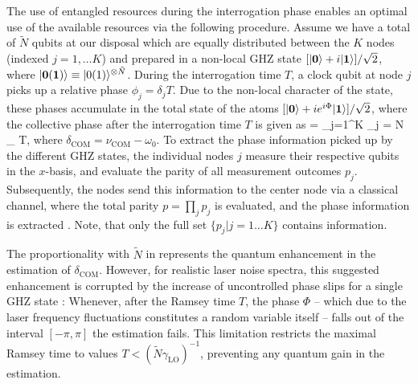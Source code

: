 The use of entangled resources 
during
the interrogation phase enables an optimal use of the available resources via
the following procedure.  Assume we have a total of $\tilde N$ 
qubits at
our disposal which are equally distributed between the $K$ nodes (indexed
$j=1,\hdots K$) and prepared in a non-local GHZ state $[| \mathbf{0} \rangle +
i| \mathbf{1} \rangle]/\sqrt{2}$, where $| \mathbf{0 (1)} \rangle\equiv| 0(1) \rangle^{\otimes
\tilde N}$. During the
interrogation time $T$, a clock qubit at node $j$ picks up a relative phase $\phi_j = \delta_j
T$.
Due to the non-local character of the state, these phases accumulate in the total
state of the atoms  $[| \mathbf{0} \rangle + i e^{i\Phi}| \mathbf{1} \rangle]/\sqrt{2}$,
where the collective phase after the interrogation time $T$ is given as
\bel
\label{eq:1}
\Phi = \sum_{j=1}^K  \phi_j =
\tilde N \delta_ T,
\eel
where $\delta_\mathrm{COM} = \nu_\mathrm{COM} - \omega_0$.
To extract the phase information picked up by the different GHZ states, 
the individual nodes $j$ measure their respective
qubits in the $x$-basis, and evaluate the parity of all measurement outcomes
$p_j$.
Subsequently, the nodes send this information to the center node via a classical
channel, where the total parity $p = \prod_{j} p_{j}$ is evaluated, and the
phase information is extracted \cite{Bollinger1996, Leibfried2004}. Note, that
only the full set $\{p_j |j=1\hdots K \}$ contains information. 

The proportionality with $\tilde N$ in  represents the quantum
enhancement in the estimation of $\delta_\mathrm{COM}$. However, for realistic
laser noise spectra, this suggested enhancement is corrupted  by the increase of
uncontrolled phase slips for a single GHZ
state 
\cite{Wineland1998}: Whenever, after the Ramsey time $T$, the phase $\Phi$ --
which due to the laser frequency fluctuations constitutes a random variable itself --
falls out of the interval $[-\pi,\pi]$ the estimation fails. This limitation
restricts the maximal Ramsey time to values $T < (\tilde
N\gamma_\mathrm{LO})^{-1}$, preventing any quantum gain in the estimation.


